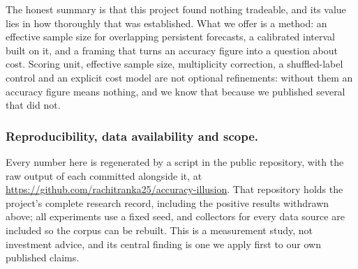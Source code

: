 \documentclass[runningheads]{llncs}
\begin{document}
The honest summary is that this project found nothing tradeable, and its value
lies in how thoroughly that was established. What we offer is a method: an
effective sample size for overlapping persistent forecasts, a calibrated interval
built on it, and a framing that turns an accuracy figure into a question about
cost. Scoring unit, effective sample size, multiplicity correction, a
shuffled-label control and an explicit cost model are not optional refinements:
without them an accuracy figure means nothing, and we know that because we
published several that did not.

\subsubsection{Reproducibility, data availability and scope.}
Every number here is regenerated by a script in the public repository, with the
raw output of each committed alongside it, at
\url{https://github.com/rachitranka25/accuracy-illusion}. That repository holds
the project's complete research record, including the positive results withdrawn
above; all experiments use a fixed seed, and collectors for every data source are
included so the corpus can be rebuilt. This is a measurement study, not
investment advice, and its central finding is one we apply first to our own
published claims.
\end{document}
